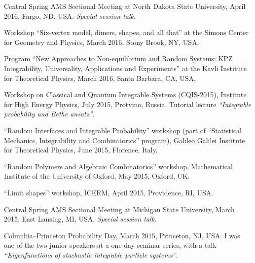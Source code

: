 \documentclass[letterpaper,11pt]{article}
\begin{document}
\begin{etaremune}
	\item
	      Central Spring AMS Sectional Meeting at North Dakota State
	      University, April 2016, Fargo, ND, USA. \emph{Special session talk}.

	\item
	      Workshop ``Six-vertex model, dimers, shapes, and all that'' at
	      the Simons Center for Geometry and Physics, March 2016, Stony Brook, NY, USA.

	\item
	      Program ``New Approaches to Non-equilibrium and Random Systems:
	      KPZ Integrability, Universality, Applications and Experiments'' at the Kavli
	      Institute for Theoretical Physics, March 2016, Santa Barbara, CA, USA.

	\item
	      Workshop on Classical and Quantum Integrable Systems
	      (CQIS-2015), Institute for High Energy Physics, July 2015, Protvino, Russia.
	      Tutorial lecture \emph{``Integrable probability and Bethe   ansatz''}.

	\item
	      ``Random Interfaces and Integrable Probability'' workshop (part
	      of ``Statistical Mechanics, Integrability and Combinatorics''
	      program), Galileo Galilei Institute for Theoretical Physics, June 2015,
	      Florence, Italy.

	\item
	      ``Random Polymers and Algebraic Combinatorics'' workshop,
	      Mathematical Institute of the University of Oxford, May 2015,
	      Oxford, UK.

	\item
	      ``Limit shapes'' workshop, ICERM, April 2015, Providence, RI,
	      USA.   %

	\item
	      Central Spring AMS Sectional Meeting at Michigan State
	      University, March 2015, East Lansing, MI, USA. \emph{Special session talk}.

	\item
	      Columbia--Princeton Probability Day, March 2015, Princeton, NJ,
	      USA. I was one of the two junior speakers at a one-day seminar series, with a
	      talk \emph{``Eigenfunctions of stochastic integrable particle systems''}.


\end{etaremune}
\end{document}
